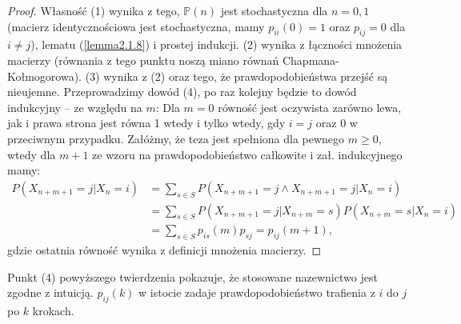 \documentclass[a4paper]{article}
\theoremstyle{defn}
\theoremstyle{theorem}
\theoremstyle{lemma}
\theoremstyle{cor}
\theoremstyle{fact}
\begin{document}
\begin{proof}
Własność (1) wynika z tego, $\mathbb{P}(n)$ jest stochastyczna dla $n= 0,1$ (macierz identycznościowa jest stochastyczna, mamy $p_{ii}(0) = 1$ oraz $p_{ij} = 0$ dla $i\neq j$), lematu (\ref{lemma2.1.8}) i prostej indukcji. (2) wynika z łączności mnożenia macierzy (równania z tego punktu noszą miano równań Chapmana-Kołmogorowa). (3) wynika z (2) oraz tego, że prawdopodobieństwa przejść są nieujemne. Przeprowadzimy dowód (4), po raz kolejny będzie to dowód indukcyjny – ze względu na $m$:
Dla $m=0$ równość jest oczywista zarówno lewa, jak i prawa strona jest równa 1 wtedy i tylko wtedy, gdy $i = j$ oraz 0 w przeciwnym przypadku. Załóżmy, że teza jest spełniona dla pewnego $m \geq 0$, wtedy dla $m+1$ ze wzoru na prawdopodobieństwo całkowite i zał. indukcyjnego mamy: \begin{align*}
    P(X_{n+m+1}=j|X_n = i) &= \sum\limits_{s \in S} P(X_{n+m+1}=j \land X_{n+m+1}=j |X_n = i) \\
    &= \sum\limits_{s \in S} P(X_{n+m+1}=j | X_{n+m}=s)P(X_{n+m}=s|X_n = i) \\
    &= \sum\limits_{s \in S} p_{is}(m)p_{sj} = p_{ij}(m+1),
\end{align*}
gdzie ostatnia równość wynika z definicji mnożenia macierzy.
\end{proof}
Punkt (4) powyższego twierdzenia pokazuje, że stosowane nazewnictwo jest zgodne z intuicją. $p_{ij}(k)$ w istocie zadaje prawdopodobieństwo trafienia z $i$ do $j$ po $k$ krokach.
\end{document}
